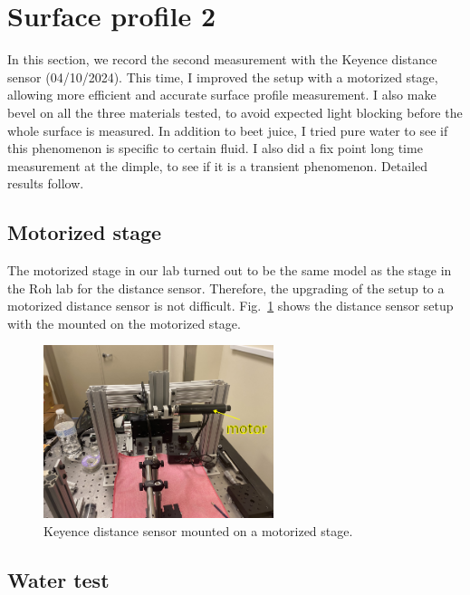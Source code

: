 \documentclass[12pt]{article}
\begin{document}
\section{Surface profile 2}

In this section, we record the second measurement with the Keyence distance sensor (04/10/2024). This time, I improved the setup with a motorized stage, allowing more efficient and accurate surface profile measurement. I also make bevel on all the three materials tested, to avoid expected light blocking before the whole surface is measured. In addition to beet juice, I tried pure water to see if this phenomenon is specific to certain fluid. I also did a fix point long time measurement at the dimple, to see if it is a transient phenomenon. Detailed results follow.

\subsection{Motorized stage}

The motorized stage in our lab turned out to be the same model as the stage in the Roh lab for the distance sensor. Therefore, the upgrading of the setup to a motorized distance sensor is not difficult. Fig.~\ref{fig:motorized_stage_for_distance_sensor} shows the distance sensor setup with the mounted on the motorized stage. 

\begin{figure}
    \centering
    \includegraphics[width=0.6\textwidth]{Figures/motorized_stage_for_distance_sensor.pdf}
    \caption{Keyence distance sensor mounted on a motorized stage.}
    \label{fig:motorized_stage_for_distance_sensor}
\end{figure}

\subsection{Water test}
\end{document}
